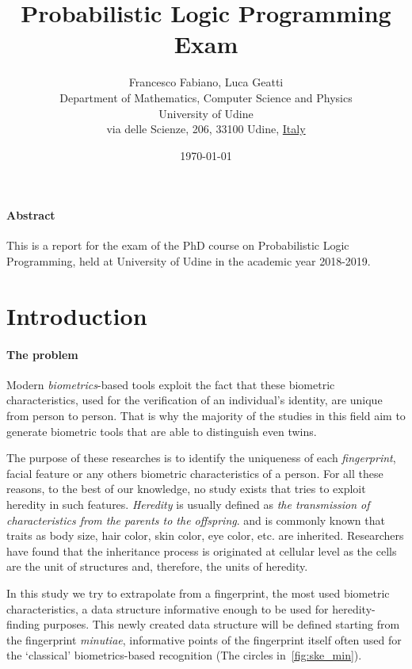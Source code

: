 \documentclass[8pt]{article}
\title{Probabilistic Logic Programming Exam}
\author{
        Francesco Fabiano, Luca Geatti\\
        \footnotesize Department of Mathematics, Computer Science and Physics \\
        \footnotesize University of Udine\\
        \footnotesize via delle Scienze, 206, 33100 Udine, \underline{Italy}
}
\date{\footnotesize\today}
\begin{document}
\maketitle
\paragraph{Abstract}
This is a report for the exam of the PhD course on Probabilistic Logic
Programming, held at University of Udine in the academic year 2018-2019.



\section{Introduction}

  \paragraph{The problem}
    Modern \textit{biometrics}-based tools exploit the fact that these biometric characteristics, used for the verification of an individual’s identity, are unique from person to person.
    That is why the majority of the studies in this field aim to generate biometric tools that are able to distinguish even twins.
    
    The purpose of these researches is to identify the uniqueness of each \textit{fingerprint}, facial feature or any others biometric characteristics of a person.
    For all these reasons, to the best of our knowledge, no study exists that tries to exploit heredity in such features.
    \textit{Heredity} is usually defined as \textit{the transmission of characteristics from the parents to the offspring}.
    and is commonly known that traits as body size, hair color, skin color, eye color, etc. are inherited.
    Researchers have found that the inheritance process is originated at cellular level as the cells are the unit of structures and, therefore, the units of heredity.
    
    In this study we try to extrapolate from a fingerprint, the most used biometric characteristics, a data structure informative enough to be used for heredity-finding purposes.
    This newly created data structure will be defined starting from the fingerprint \textit{minutiae}, informative points of the fingerprint itself often used for the \textquoteleft classical' biometrics-based recognition (The circles in~\cref{fig:ske_min}).
\end{document}

